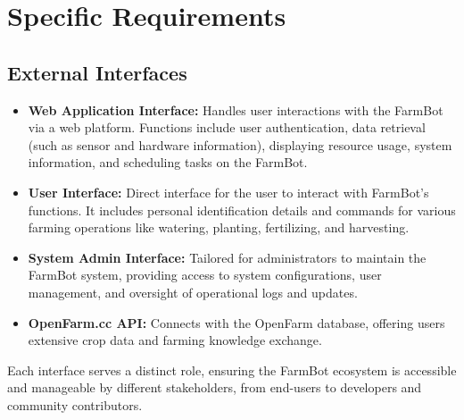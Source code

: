\chapter{Specific Requirements} \label{specificRequirements}
\section{External Interfaces}
\begin{itemize}
  \item \textbf{Web Application Interface:} Handles user interactions with the FarmBot via a web platform. Functions include user authentication, data retrieval (such as sensor and hardware information), displaying resource usage, system information, and scheduling tasks on the FarmBot.
  \item \textbf{User Interface:} Direct interface for the user to interact with FarmBot's functions. It includes personal identification details and commands for various farming operations like watering, planting, fertilizing, and harvesting.
  \item \textbf{System Admin Interface:} Tailored for administrators to maintain the FarmBot system, providing access to system configurations, user management, and oversight of operational logs and updates.
  \item \textbf{OpenFarm.cc API:} Connects with the OpenFarm database, offering users extensive crop data and farming knowledge exchange.
\end{itemize}
Each interface serves a distinct role, ensuring the FarmBot ecosystem is accessible and manageable by different stakeholders, from end-users to developers and community contributors.

